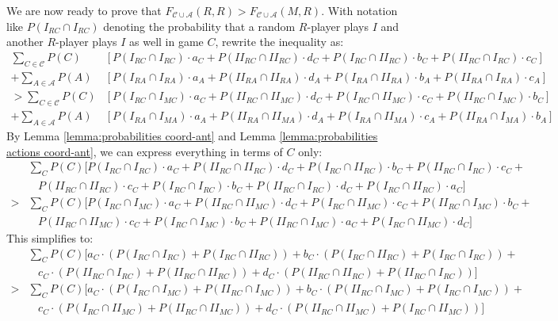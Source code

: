 \documentclass[fleqn,reqno,12pt]{article}
\theoremstyle{Satz}
\theoremstyle{Bsp}
\begin{document}
\noindent We are now ready to prove that
$F_{\mathcal{C}\cup\mathcal{A}}(R,R)>F_{\mathcal{C}\cup\mathcal{A}}(M,R)$. With notation like
$P(I_{RC} \cap I_{RC})$ denoting the probability that a random $R$-player plays $I$ and another
$R$-player plays $I$ as well in game $C$, rewrite the inequality as:
\begin{align*}
   \sum_{C \in \mathcal{C}}P(C) & [P(I_{RC}\cap I_{RC})\cdot a_{C}+P(II_{RC}\cap II_{RC})\cdot
  d_{C}+P(I_{RC}\cap II_{RC})\cdot b_{C}+P(II_{RC}\cap I_{RC})\cdot c_{C}] 
  \\ + \sum_{A \in
    \mathcal{A}}P(A) & [P(I_{RA}\cap I_{RA})\cdot a_{A}+P(II_{RA}\cap II_{RA})\cdot
  d_{A}+P(I_{RA}\cap II_{RA})\cdot b_{A}+P(II_{RA}\cap I_{RA})\cdot c_{A}]\\
  > \sum_{C \in
    \mathcal{C}}P(C) & [P(I_{RC}\cap I_{MC})\cdot a_{C}+P(II_{RC}\cap II_{MC})\cdot
  d_{C}+P(I_{RC}\cap II_{MC})\cdot c_{C}+P(II_{RC}\cap I_{MC})\cdot b_{C}] \\
   + \sum_{A \in
    \mathcal{A}}P(A) & [P(I_{RA}\cap I_{MA})\cdot a_{A}+P(II_{RA}\cap II_{MA})\cdot
  d_{A}+P(I_{RA}\cap II_{MA})\cdot c_{A}+P(II_{RA}\cap I_{MA})\cdot b_{A}]
\end{align*}
\noindent By Lemma \ref{lemma:probabilities coord-ant} and Lemma \ref{lemma:probabilities
  actions coord-ant}, we can express everything in terms of $C$ only:
\begin{align*}
  & \textstyle{\sum_{C}} P(C)[P(I_{RC}\cap I_{RC})\cdot a_{C}+P(II_{RC}\cap II_{RC})\cdot d_{C}+P(I_{RC}\cap
  II_{RC})\cdot b_{C}+P(II_{RC}\cap I_{RC})\cdot c_{C} + \\
  & \ \ \ \ P(II_{RC}\cap II_{RC})\cdot c_{C}+P(I_{RC}\cap I_{RC})\cdot b_{C}+P(II_{RC}\cap
  I_{RC})\cdot d_{C}+P(I_{RC}\cap
  II_{RC})\cdot a_{C}] \\
  > & \textstyle{\sum_{C}}P(C)[P(I_{RC}\cap I_{MC})\cdot a_{C}+P(II_{RC}\cap II_{MC})\cdot
  d_{C}+P(I_{RC}\cap II_{MC})\cdot c_{C}+P(II_{RC}\cap I_{MC})\cdot b_{C} + \\
  & \ \ \ \ P(II_{RC}\cap II_{MC})\cdot c_{C}+P(I_{RC}\cap I_{MC})\cdot b_{C}+P(II_{RC}\cap
  I_{MC})\cdot a_{C}+P(I_{RC}\cap II_{MC})\cdot d_{C}]
\end{align*}
This simplifies to:
\begin{align*}
  & \textstyle{\sum_{C}}P(C)[a_{C} \cdot (P(I_{RC}\cap I_{RC}) + P(I_{RC}\cap II_{RC})) + b_{C}
  \cdot (P(I_{RC}\cap II_{RC}) + P(I_{RC}\cap I_{RC})) + 
\\ & \ \ \ \ c_{C} \cdot
  (P(II_{RC}\cap I_{RC}) +P(II_{RC}\cap II_{RC})) + d_{C} \cdot (P(II_{RC}\cap
  II_{RC})+P(II_{RC}\cap I_{RC}))] 
\\ > & \textstyle{\sum_{C}}P(C)[a_{C} \cdot (P(I_{RC}\cap
  I_{MC})+P(II_{RC}\cap I_{MC})) + b_{C} \cdot (P(II_{RC}\cap I_{MC})+P(I_{RC}\cap I_{MC})) + \\
  & \ \ \ \ c_{C} \cdot (P(I_{RC}\cap II_{MC})+P(II_{RC}\cap II_{MC})) + d_{C} \cdot (P(II_{RC}\cap
  II_{MC})+P(I_{RC}\cap II_{MC}))]
\end{align*}
\end{document}
